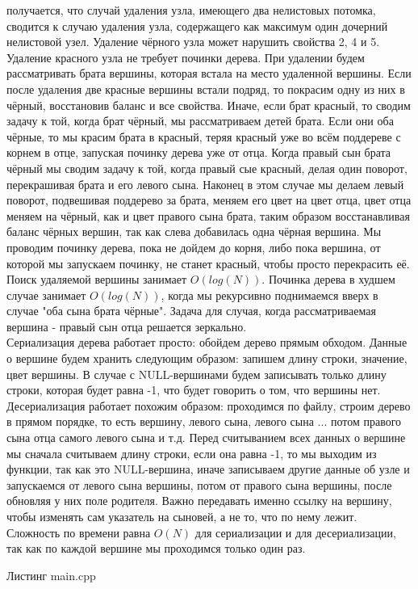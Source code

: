 получается, что случай удаления узла, имеющего два нелистовых потомка, сводится к случаю удаления узла, содержащего как максимум один дочерний нелистовой узел. Удаление 
чёрного узла может нарушить свойства 2, 4 и 5. Удаление красного узла не требует починки дерева. При удалении будем рассматривать брата вершины, которая встала на место
удаленной вершины. Если после удаления две красные вершины встали подряд, то покрасим одну из них в чёрный, восстановив баланс и все свойства. Иначе, если брат красный,
то сводим задачу к той, когда брат чёрный, мы рассматриваем детей брата. Если они оба чёрные, то мы красим брата в красный, теряя красный уже во всём поддереве с корнем
в отце, запуская починку дерева уже от отца. Когда правый сын брата чёрный мы сводим задачу к той, когда правый сые красный, делая один поворот, перекрашивая брата и его 
левого сына. Наконец в этом случае мы делаем левый поворот, подвешивая поддерево за брата, меняем его цвет на цвет отца, цвет отца меняем на чёрный, как и цвет правого 
сына брата, таким образом восстанавливая баланс чёрных вершин, так как слева добавилась одна чёрная вершина. Мы проводим починку дерева, пока не дойдем до корня, либо пока
вершина, от которой мы запускаем починку, не станет красный, чтобы просто перекрасить её. Поиск удаляемой вершины занимает $O(log(N))$. Починка дерева в худшем случае занимает 
$O(log(N))$, когда мы рекурсивно поднимаемся вверх в случае "оба сына брата чёрные". Задача для случая, когда рассматриваемая вершина - правый сын отца решается зеркально.
\\Сериализация дерева работает просто: обойдем дерево прямым обходом. Данные о вершине будем хранить следующим образом: запишем длину строки, значение, цвет вершины. В случае 
с NULL-вершинами будем записывать только длину строки, которая будет равна -1, что будет говорить о том, что вершины нет. Десериализация работает похожим образом: проходимся по
файлу, строим дерево в прямом порядке, то есть вершину, левого сына, левого сына ... потом правого сына отца самого левого сына и т.д. Перед считыванием всех данных о вершине мы
сначала считываем длину строки, если она равна -1, то мы выходим из функции, так как это NULL-вершина, иначе записываем другие данные об узле и запускаемся от левого сына вершины,
потом от правого сына вершины, после обновляя у них поле родителя. Важно передавать именно ссылку на вершину, чтобы изменять сам указатель на сыновей, а не то, что по нему лежит.
Сложность по времени равна $O(N)$ для сериализации и для десериализации, так как по каждой вершине мы проходимся только один раз. 
\begin{center}Листинг main.cpp\end{center}
